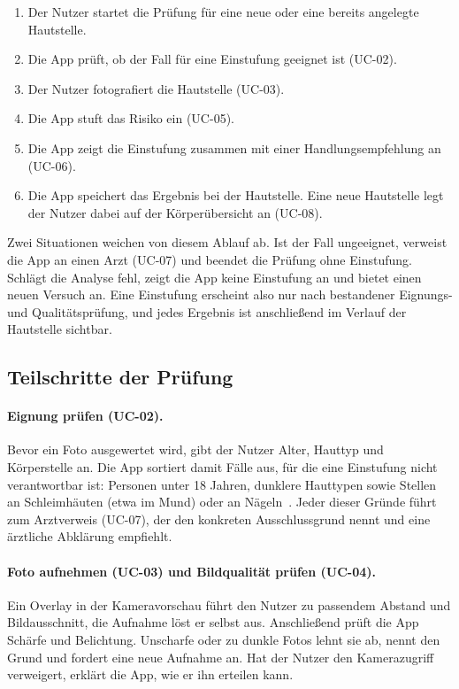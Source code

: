 \begin{enumerate}
\item Der Nutzer startet die Prüfung für eine neue oder eine bereits angelegte Hautstelle.
\item Die App prüft, ob der Fall für eine Einstufung geeignet ist (UC-02).
\item Der Nutzer fotografiert die Hautstelle (UC-03).
\item Die App stuft das Risiko ein (UC-05).
\item Die App zeigt die Einstufung zusammen mit einer Handlungsempfehlung an (UC-06).
\item Die App speichert das Ergebnis bei der Hautstelle. Eine neue Hautstelle legt der Nutzer dabei auf der Körperübersicht an (UC-08).
\end{enumerate}

Zwei Situationen weichen von diesem Ablauf ab. Ist der Fall ungeeignet, verweist die App an einen Arzt (UC-07) und beendet die Prüfung ohne Einstufung. Schlägt die Analyse fehl, zeigt die App keine Einstufung an und bietet einen neuen Versuch an. Eine Einstufung erscheint also nur nach bestandener Eignungs- und Qualitätsprüfung, und jedes Ergebnis ist anschließend im Verlauf der Hautstelle sichtbar.

\subsection{Teilschritte der Prüfung}

\paragraph{Eignung prüfen (UC-02).} Bevor ein Foto ausgewertet wird, gibt der Nutzer Alter, Hauttyp und Körperstelle an. Die App sortiert damit Fälle aus, für die eine Einstufung nicht verantwortbar ist: Personen unter 18 Jahren, dunklere Hauttypen sowie Stellen an Schleimhäuten (etwa im Mund) oder an Nägeln~\cite{skinscreener-ifu,nice-htg746}. Jeder dieser Gründe führt zum Arztverweis (UC-07), der den konkreten Ausschlussgrund nennt und eine ärztliche Abklärung empfiehlt.

\paragraph{Foto aufnehmen (UC-03) und Bildqualität prüfen (UC-04).} Ein Overlay in der Kameravorschau führt den Nutzer zu passendem Abstand und Bildausschnitt, die Aufnahme löst er selbst aus. Anschließend prüft die App Schärfe und Belichtung. Unscharfe oder zu dunkle Fotos lehnt sie ab, nennt den Grund und fordert eine neue Aufnahme an. Hat der Nutzer den Kamerazugriff verweigert, erklärt die App, wie er ihn erteilen kann.

